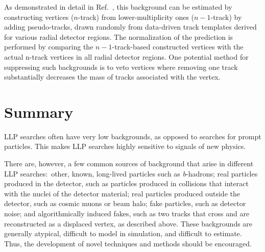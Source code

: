 As demonstrated in detail in Ref.~\cite{Aaboud:2017iio,Aad:2015rba}, this background can be estimated by constructing vertices ($n$-track) from lower-multiplicity ones ($n-1$-track) by adding pseudo-tracks, drawn randomly from data-driven track templates derived for various radial detector regions. The normalization of the prediction is performed by comparing the $n-1$-track-based constructed vertices with the actual n-track vertices in all radial detector regions. One potential method for suppressing such backgrounds is to veto vertices where removing one track substantially decreases the mass of tracks associated with the vertex.

\section{Summary} %

LLP searches often have very low backgrounds, as opposed to searches for prompt particles. This makes LLP searches highly sensitive to signals of new physics.

There are, however, a few common sources of background that arise in different LLP searches:~other, known, long-lived particles such as \textit{b}-hadrons; real particles produced in the detector, such as particles produced in collisions that interact with the nuclei of the detector material; real particles produced outside the detector, such as cosmic muons or beam halo; fake particles, such as detector noise; and algorithmically induced fakes, such as two tracks that cross and are reconstructed as a displaced vertex, as described above. These backgrounds are generally atypical, difficult to model in simulation, and difficult to estimate. Thus, the development of novel techniques and methods should be encouraged.
